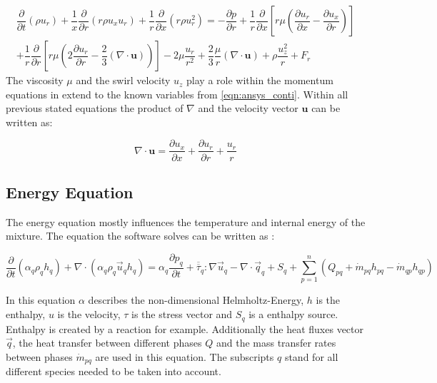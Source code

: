 \documentclass[../thesis.tex]{subfiles}
\begin{document}
\begin{gather}
	\dfrac{\partial}{\partial t}(\rho u_r) + \dfrac{1}{x} \dfrac{\partial}{\partial r}(r \rho u_x u_r)
	+ \dfrac{1}{r} \dfrac{\partial}{\partial x}(r \rho u_r^2) = 
	- \dfrac{\partial p}{\partial r} + \dfrac{1}{r} \dfrac{\partial }{\partial x} \left[ 
	r \mu \left( \dfrac{\partial u_r}{\partial x} - \dfrac{\partial u_x}{\partial r} \right)
	\right] \\ \nonumber
	+ \dfrac{1}{r} \dfrac{\partial }{\partial r} \left[ 
	r \mu \left( 2 \dfrac{\partial u_r}{\partial r} - \dfrac{2}{3}(\nabla \cdot \mathbf{u}) \right)
	\right] -
	2 \mu \dfrac{u_r}{r^2}+ \dfrac{2}{3} \dfrac{\mu}{r}(\nabla \cdot \mathbf{u}) + \rho \dfrac{u_z^2}{r} + F_r
\end{gather}
The viscosity $\mu$ and the swirl velocity $u_z$ play a role within the momentum equations in extend to the known variables from \autoref{eqn:ansys_conti}. 
Within all previous stated equations the product of $\nabla$ and the velocity vector $\mathbf{u}$ can be written as:

\begin{equation}
\nabla \cdot \mathbf{u} = \dfrac{\partial u_x}{\partial x} + \dfrac{\partial u_r}{\partial r}+ \dfrac{u_r}{r}
\end{equation}


\subsection{Energy Equation}

The energy equation mostly influences the temperature and internal energy of the mixture. The equation the software solves can be written as \cite{manual2009ansys}:

\begin{equation} 
\frac{\partial}{\partial t} (\alpha_q \rho_q h_q ) + \nabla \cdot (\alpha_q \rho_q \vec u_q h_q )   = \alpha_q \frac{\partial p_q}{\partial t} + \overline{\overline{\tau}}_q : \nabla \vec u_q - \nabla \cdot \vec q_q + S_q + \sum_{p=1}^n (Q_{pq}  + \dot{m}_{pq} h_{pq} - \dot{m}_{qp} h_{qp}) 
\end{equation}

In this equation $\alpha$ describes the non-dimensional Helmholtz-Energy, $h$ is the enthalpy, $u$ is the velocity, $\tau$ is the stress vector and $S_q$ is a enthalpy source. Enthalpy is created by a reaction for example. Additionally the heat fluxes vector $ \vec q$, the heat transfer between different phases $Q$ and the mass transfer rates between phases $\dot{m}_{pq}$ are used in this equation. The subscripts $q$ stand for all different species needed to be taken into account.
\end{document}
